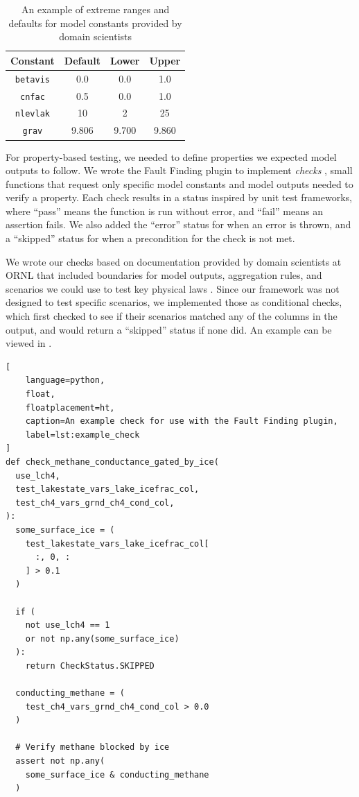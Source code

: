 \documentclass[10pt,twocolumn]{article}
\newcommand{\term}[1]{%
    \emph{#1}%
}
\begin{document}
\begin{table}[ht]
    \centering
    \caption{
        An example of extreme ranges and defaults for model constants provided by domain 
        scientists
    }
    \label{tab:constant_ranges}
    \begin{tabular}{c c c c}
        \toprule
        Constant & Default & Lower & Upper \\
        \midrule
        \verb|betavis| & 0.0 & 0.0 & 1.0 \\
        \verb|cnfac| & 0.5 & 0.0 & 1.0 \\
        \verb|nlevlak| & 10 & 2 & 25 \\
        \verb|grav| & 9.806 & 9.700 & 9.860 \\
        \bottomrule
    \end{tabular}
\end{table}

For property-based testing, we needed to define properties we expected model 
outputs to follow. We wrote the Fault Finding plugin to 
implement \term{checks}, small functions that request only specific model constants 
and model outputs needed to verify a property. Each check results in a status inspired by unit test frameworks, where 
``pass'' means the function is run without error, and ``fail'' means an assertion fails. We 
also added the ``error'' status for when an error is thrown, and a ``skipped'' status for when 
a precondition for the check is not met.

We wrote our checks based on documentation provided by domain scientists at ORNL that 
included boundaries for model outputs, aggregation rules, and scenarios we could use to 
test key physical laws \cite{peter-and-dali}. Since our framework was not designed to test 
specific scenarios, we implemented those as conditional checks, which first checked to see 
if their scenarios matched any of the columns in the output, and would return a 
``skipped'' status if none did. An example can be viewed in .

\begin{lstlisting}[
    language=python,
    float,
    floatplacement=ht,
    caption=An example check for use with the Fault Finding plugin,
    label=lst:example_check
]
def check_methane_conductance_gated_by_ice(
  use_lch4,
  test_lakestate_vars_lake_icefrac_col,
  test_ch4_vars_grnd_ch4_cond_col,
):
  some_surface_ice = (
    test_lakestate_vars_lake_icefrac_col[
      :, 0, :
    ] > 0.1
  )

  if (
    not use_lch4 == 1
    or not np.any(some_surface_ice)
  ):
    return CheckStatus.SKIPPED

  conducting_methane = (
    test_ch4_vars_grnd_ch4_cond_col > 0.0
  )

  # Verify methane blocked by ice
  assert not np.any(
    some_surface_ice & conducting_methane
  )
\end{lstlisting}
\end{document}
